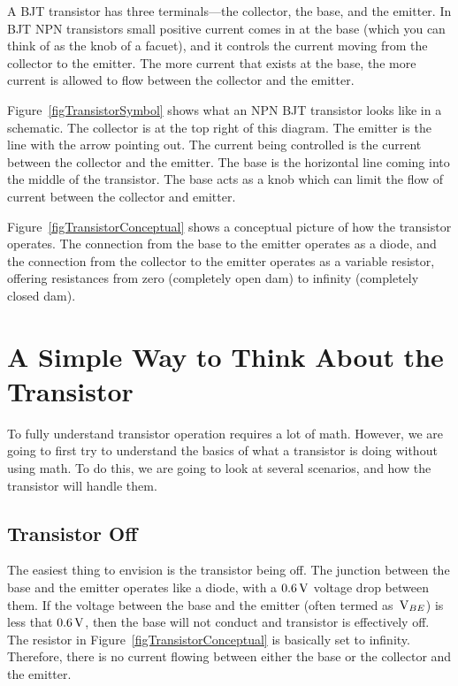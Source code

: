
A BJT transistor has three terminals---the collector, the base, and the emitter.
In BJT NPN transistors small positive current comes in at the base (which you can think of as the knob of a facuet), and it controls the current moving from the collector to the emitter.
The more current that exists at the base, the more current is allowed to flow between the collector and the emitter.

Figure~\ref{figTransistorSymbol} shows what an NPN BJT transistor looks like in a schematic.
The collector is at the top right of this diagram.  
The emitter is the line with the arrow pointing out.
The current being controlled is the current between the collector and the emitter.
The base is the horizontal line coming into the middle of the transistor.
The base acts as a knob which can limit the flow of current between the collector and emitter.

Figure~\ref{figTransistorConceptual} shows a conceptual picture of how the transistor operates.
The connection from the base to the emitter operates as a diode, and the connection from the collector to the emitter operates as a variable resistor, offering resistances from zero (completely open dam) to infinity (completely closed dam).


\section{A Simple Way to Think About the Transistor}

To fully understand transistor operation requires a lot of math.
However, we are going to first try to understand the basics of what a transistor is doing without using math.
To do this, we are going to look at several scenarios, and how the transistor will handle them.

\subsection{Transistor Off}

The easiest thing to envision is the transistor being off.
The junction between the base and the emitter operates like a diode, with a $0.6\,\si{\volt}$ voltage drop between them.
If the voltage between the base and the emitter (often termed as $\,\si{\volt}_{BE}$) is less that $0.6\,\si{\volt}$, then the base will not conduct and transistor is effectively off.
The resistor in Figure~\ref{figTransistorConceptual} is basically set to infinity.
Therefore, there is no current flowing between either the base or the collector and the emitter.

